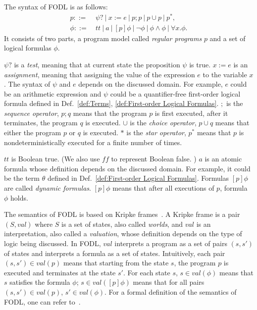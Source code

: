 \documentclass{fcs}
\newcommand{\true}[0]{\mathit{tt}}
\newcommand{\false}[0]{\mathit{ff}}
\newcommand{\val}[0]{\mathit{val}}
\DeclareMathOperator{\seq}{;}
\newcommand{\ddef}[0]{::=}
\begin{document}
The syntax of FODL is as follows:
$$
\begin{aligned}
p\ddef &\ \psi?\ |\ x:=e\ |\ p\seq p\ |\ p\cup p\ |\ p^*, \\
\phi\ddef &\ \true\ |\ a\ |\ [p]\phi\ |\ \neg \phi\ |\ \phi\wedge\phi\ |\ \forall x.\phi.
\end{aligned}
$$
It consists of two parts, a program model called \emph{regular programs} $p$ and a set of logical formulas $\phi$.

$\psi?$ is a \emph{test}, meaning that at current state the proposition $\psi$ is true. %
$x:=e$ is an \emph{assignment}, meaning that assigning the value of the expression $e$ to the variable $x$. %
The syntax of $\psi$ and $e$ depends on the discussed domain. For example, $e$ could be an arithmetic expression and $\psi$ could be a quantifier-free first-order logical formula defined in Def.~\ref{def:Terms}, \ref{def:First-order Logical Formulas}.
$\seq$ is the \emph{sequence operator}, $p\seq q$ means that the program $p$ is first executed, after it terminates, the program $q$ is executed.
$\cup$ is the \emph{choice operator}, $p\cup q$ means that either the program $p$ or $q$ is executed.
$*$ is the \emph{star operator}, $p^*$ means that $p$ is nondeterministically executed  for a finite number of times.

$\true$ is Boolean true. (We also use $\false$ to represent Boolean false. )
$a$ is an atomic formula whose definition depends on the discussed domain.
For example, it could be the term $\theta$ defined in Def.~\ref{def:First-order Logical Formulas}.
Formulas $[p]\phi$ are called \emph{dynamic formulas}.
$[p]\phi$ means that after all executions of $p$, formula $\phi$ holds.

The semantics of FODL is based on Kripke frames~\cite{Harel00}.
A Kripke frame is a pair $(S, \val)$ where $S$ is a set of states, also called \emph{worlds}, and $\val$ is an interpretation, also called a \emph{valuation}, whose definition depends on the type of logic being discussed.
In FODL, $\val$ interprets a program as a set of pairs $(s, s')$ of states and interprets a formula as a set of states.
Intuitively, each pair $(s, s')\in \val(p)$ means that starting from the state $s$, the program $p$ is executed and terminates at the state $s'$.
For each state $s$, $s\in \val(\phi)$ means that $s$ satisfies the formula $\phi$; $s\in \val([p]\phi)$ means that for all pairs $(s,s')\in \val(p)$, $s'\in \val(\phi)$.
For a formal definition of the semantics of FODL, one can refer to~\cite{Harel00}.
\end{document}
